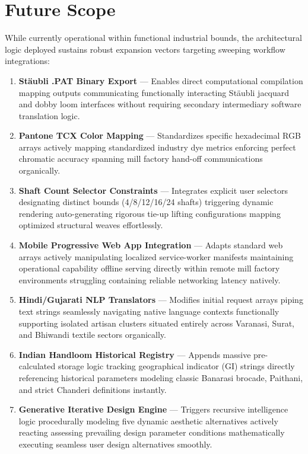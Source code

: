 \section{Future Scope}
While currently operational within functional industrial bounds, the architectural logic deployed sustains robust expansion vectors targeting sweeping workflow integrations:
\begin{enumerate}
    \item \textbf{Stäubli .PAT Binary Export} — Enables direct computational compilation mapping outputs communicating functionally interacting Stäubli jacquard and dobby loom interfaces without requiring secondary intermediary software translation logic.
    \item \textbf{Pantone TCX Color Mapping} — Standardizes specific hexadecimal RGB arrays actively mapping standardized industry dye metrics enforcing perfect chromatic accuracy spanning mill factory hand-off communications organically.
    \item \textbf{Shaft Count Selector Constraints} — Integrates explicit user selectors designating distinct bounds (4/8/12/16/24 shafts) triggering dynamic rendering auto-generating rigorous tie-up lifting configurations mapping optimized structural weaves effortlessly.
    \item \textbf{Mobile Progressive Web App Integration} — Adapts standard web arrays actively manipulating localized service-worker manifests maintaining operational capability offline serving directly within remote mill factory environments struggling containing reliable networking latency natively.
    \item \textbf{Hindi/Gujarati NLP Translators} — Modifies initial request arrays piping text strings seamlessly navigating native language contexts functionally supporting isolated artisan clusters situated entirely across Varanasi, Surat, and Bhiwandi textile sectors organically.
    \item \textbf{Indian Handloom Historical Registry} — Appends massive pre-calculated storage logic tracking geographical indicator (GI) strings directly referencing historical parameters modeling classic Banarasi brocade, Paithani, and strict Chanderi definitions instantly.
    \item \textbf{Generative Iterative Design Engine} — Triggers recursive intelligence logic procedurally modeling five dynamic aesthetic alternatives actively reacting assessing prevailing design parameter conditions mathematically executing seamless user design alternatives smoothly.
\end{enumerate}

